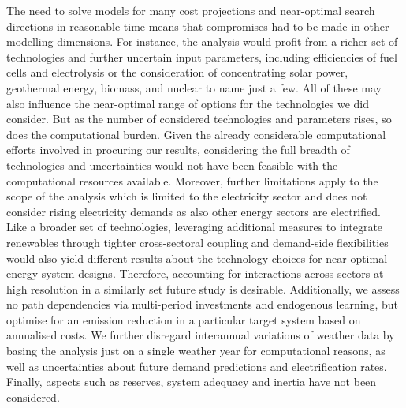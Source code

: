 The need to solve models for many cost projections and near-optimal search
directions in reasonable time means that compromises had to be made in other
modelling dimensions. For instance, the analysis would profit from a richer set
of technologies and further uncertain input parameters, including efficiencies
of fuel cells and electrolysis or the consideration of concentrating solar
power, geothermal energy, biomass, and nuclear to name just a few. All of these
may also influence the near-optimal range of options for the technologies we did
consider. But as the number of considered technologies and parameters rises, so
does the computational burden. Given the already considerable computational
efforts involved in procuring our results, considering the full breadth of
technologies and uncertainties would not have been feasible with the
computational resources available. Moreover, further limitations apply to the
scope of the analysis which is limited to the electricity sector and does not
consider rising electricity demands as also other energy sectors are
electrified. Like a broader set of technologies, leveraging additional measures
to integrate renewables through tighter cross-sectoral coupling and demand-side
flexibilities would also yield different results about the technology choices
for near-optimal energy system designs. Therefore, accounting for interactions
across sectors at high resolution in a similarly set future study is desirable.
Additionally, we assess no path dependencies via multi-period investments and
endogenous learning, but optimise for an emission reduction in a particular
target system based on annualised costs. We further disregard interannual
variations of weather data by basing the analysis just on a single weather year
for computational reasons, as well as uncertainties about future demand
predictions and electrification rates. Finally, aspects such as reserves, system
adequacy and inertia have not been considered.
